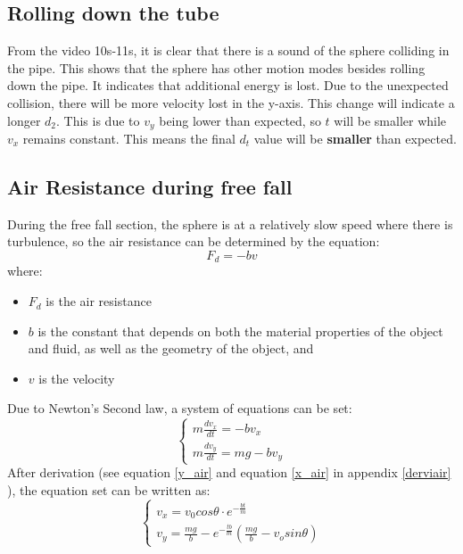 \documentclass{article}
\begin{document}
        
    \subsection{Rolling down the tube}
    From the video \cite{youtube} 10s-11s, it is clear that there is a sound of the sphere colliding in the pipe. This shows that the sphere has other motion modes besides rolling down the pipe. It indicates that additional energy is lost. Due to the unexpected collision, there will be more velocity lost in the y-axis. This change will indicate a longer $d_2$. This is due to $v_y$ being lower than expected, so $t$ will be smaller while $v_x$ remains constant. This means the final $d_t$ value will be \textbf{smaller} than expected.
    \subsection{Air Resistance during free fall}
        During the free fall section, the sphere is at a relatively slow speed where there is turbulence, so the air resistance can be determined by the equation:
        \begin{equation}
            F_d = -bv
        \end{equation}
        where:
        \begin{itemize}
            \item $F_d$ is the air resistance
            \item $b$ is the constant that depends on both the material properties of the object and fluid, as well as the geometry of the object, and
            \item $v$ is the velocity
        \end{itemize}
        Due to Newton's Second law, a system of equations can be set:
        \begin{equation*}
            \begin{cases}
            m\frac{dv_x}{dt} = -bv_x\\
            m\frac{dv_y}{dt} = mg-bv_y
            \end{cases}
        \end{equation*}
        After derivation (see equation \ref{y_air} and equation \ref{x_air} in appendix \ref{derviair} ), the equation set can be written as:
        \begin{equation*}
            \begin{cases}
            v_x = v_0cos\theta\cdot e^{-\frac{bt}{m}}\\
            v_y = \frac{mg}{b} - e^{-\frac{tb}{m}}(\frac{mg}{b}-v_osin\theta)
            \end{cases}
        \end{equation*}
\end{document}
